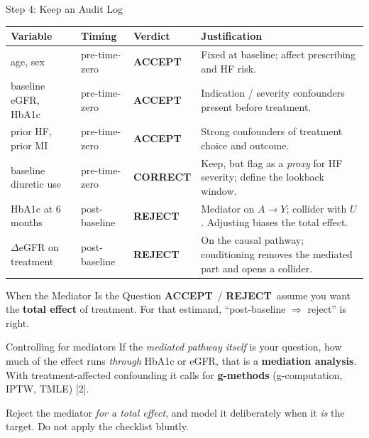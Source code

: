 \documentclass[aspectratio=169]{beamer}
\newcommand{\vaccept}{\textcolor{good}{\textbf{ACCEPT}}}
\newcommand{\vcorrect}{\textcolor{accent}{\textbf{CORRECT}}}
\newcommand{\vreject}{\textcolor{brick}{\textbf{REJECT}}}
\begin{document}
\begin{frame}{Step 4: Keep an Audit Log}
  \scriptsize
  \setlength{\tabcolsep}{3pt}
  \renewcommand{\arraystretch}{1.2}
  \begin{tabular}{@{}p{2.5cm} p{1.6cm} l p{5.6cm}@{}}
    \toprule
    \textbf{Variable} & \textbf{Timing} & \textbf{Verdict} & \textbf{Justification} \\
    \midrule
    age, sex & pre-time-zero & \vaccept & Fixed at baseline; affect prescribing and HF risk. \\
    baseline eGFR, HbA1c & pre-time-zero & \vaccept & Indication / severity confounders present before treatment. \\
    prior HF, prior MI & pre-time-zero & \vaccept & Strong confounders of treatment choice and outcome. \\
    baseline diuretic use & pre-time-zero & \vcorrect & Keep, but flag as a \emph{proxy} for HF severity; define the lookback window. \\
    \textcolor{brick}{HbA1c at 6 months} & \textcolor{brick}{post-baseline} & \vreject & Mediator on $A\!\to\!Y$; collider with $U$. Adjusting biases the total effect. \\
    \textcolor{brick}{$\Delta$eGFR on treatment} & \textcolor{brick}{post-baseline} & \vreject & On the causal pathway; conditioning removes the mediated part and opens a collider. \\
    \bottomrule
  \end{tabular}
  \vspace{0.5em}

\end{frame}

\begin{frame}{When the Mediator Is the Question}
  \small
  \vaccept\ / \vreject\ assume you want the \textbf{total effect} of treatment.
  For that estimand, ``post-baseline $\Rightarrow$ reject'' is right.
  \vspace{0.6em}

  \begin{block}{Controlling for mediators}
    If the \emph{mediated pathway itself} is your question, how much of the effect
    runs \emph{through} HbA1c or eGFR, that is a \textbf{mediation analysis}. With
    treatment-affected confounding it calls for \textbf{g-methods} (g-computation,
    IPTW, TMLE) [2].
  \end{block}
  \vspace{0.4em}

  {\color{black} Reject the mediator \emph{for a total effect}, and model it deliberately
  when it \emph{is} the target. Do not apply the checklist bluntly.}
\end{frame}
\end{document}
